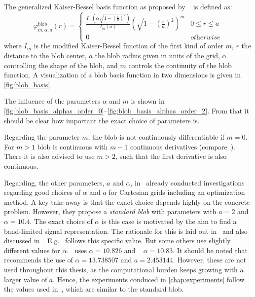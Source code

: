 \begin{definition}\label{def:blob_basis_fn}
	The generalized Kaiser-Bessel basis function as proposed by
	\citeauthor{lewitt_multidimensional_1990}~\cite{lewitt_multidimensional_1990,
		lewitt_alternatives_1992} is defined as:
	\[
		\varphi^{\text{blob}}_{m, \alpha, a}(r) =
		\begin{cases}
			\frac{I_m\left( \alpha \sqrt{1 - \left(\frac{r}{a}\right)^2} \right)} {I_m\left( \alpha \right)} \left( \sqrt{1 - \left(\frac{r}{a}\right)^2}\right)^m & 0 \le r \le a      \\
			0                                                                                                                                                      & \textit{otherwise}
		\end{cases}
	\]
	where \(I_m\) is the modified Kaiser-Bessel function of the first kind of order \(m\), \(r\) the
	distance to the blob center, \(a\) the blob radius given in units of the grid, \(\alpha\)
	controlling the shape of the blob, and \(m\) controls the continuity of the blob function. A
	visualization of a blob basis function in two dimensions is given in \autoref{fig:blob_basis}.
\end{definition}

The influence of the parameters \(\alpha\) and \(m\) is shown in
\autoref{fig:blob_basis_alphas_order_0}--\autoref{fig:blob_basis_alphas_order_2}. From that it
should be clear how important the exact choice of parameters is.

Regarding the parameter \(m\), the blob is not continuously differentiable if \(m = 0\). For \(m >
1\) blob is continuous with \(m - 1\) continuous derivatives (compare~\cite{matej_practical_1996}).
There it is also advised to use \(m > 2\), such that the first derivative is also continuous.

Regarding, the other parameters, \(a\) and \(\alpha\), \citeauthor{matej_practical_1996}
in~\cite{matej_practical_1996} already conducted investigations regarding good choices of \(\alpha\)
and \(a\) for Cartesian grids including an optimization method. A key take-away is that the exact
choice depends highly on the concrete problem. However, they propose a \textit{standard blob} with
parameters with \(a = 2\) and \(\alpha = 10.4\). The exact choice of \(\alpha\) is this case is
motivated by the aim to find a band-limited signal representation. The rationale for this is laid
out in~\cite{lewitt_multidimensional_1990} and also discussed in~\cite{benkarroum_blob_2015}.
E.g.~\cite{xu_investigation_2012} follows this specific value. But some others use slightly
different values for \(\alpha\).~\cite{kohler_iterative_2011} uses \(\alpha = 10.826\) and
~\cite{levakhina_three-dimensional_2014} \(\alpha = 10.83\). It should be noted
that~\cite{benkarroum_blob_2015} recommends the use of \(\alpha = 13.738507\) and \(a = 2.453144\).
However, these are not used throughout this thesis, as the computational burden keeps growing with a
larger value of \(a\). Hence, the experiments conduced in \autoref{chap:experiments} follow the
values used in~\cite{levakhina_three-dimensional_2014}, which are similar to the standard blob.

